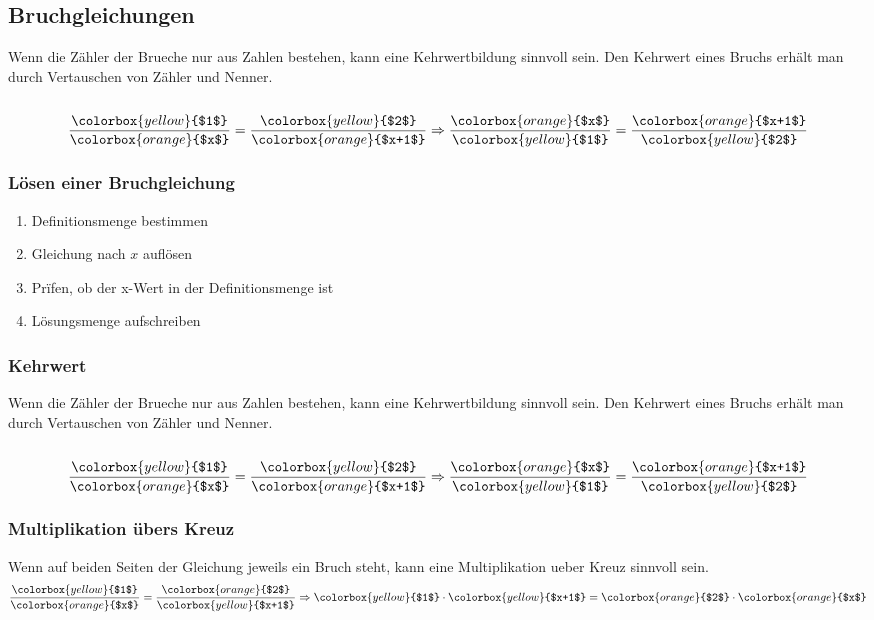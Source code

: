 \begin{multicols*}{3}
    \subsection*{Bruchgleichungen}
    Wenn die Zähler der Brueche nur aus Zahlen bestehen, kann eine Kehrwertbildung sinnvoll sein.
    Den Kehrwert eines Bruchs erhält man durch Vertauschen von Zähler und Nenner.\\~\\
    \[\frac{{\colorbox{yellow}{$1$}}}{{\colorbox{orange}{$x$}}} = \frac{{\colorbox{yellow}{$2$}}}{{\colorbox{orange}{$x+1$}}} \Rightarrow  \frac{{\colorbox{orange}{$x$}}}{{\colorbox{yellow}{$1$}}} = \frac{{\colorbox{orange}{$x+1$}}}{{\colorbox{yellow}{$2$}}}\]
    \subsubsection*{Lösen einer Bruchgleichung}
    \begin{enumerate}
        \item Definitionsmenge bestimmen
        \item Gleichung nach $x$ auflösen
        \item Prïfen, ob der x-Wert in der Definitionsmenge ist
        \item Lösungsmenge aufschreiben
    \end{enumerate}
    \subsubsection*{Kehrwert}
    Wenn die Zähler der Brueche nur aus Zahlen bestehen, kann eine Kehrwertbildung sinnvoll sein.
    Den Kehrwert eines Bruchs erhält man durch Vertauschen von Zähler und Nenner.\\~\\
    \[\frac{{\colorbox{yellow}{$1$}}}{{\colorbox{orange}{$x$}}} = \frac{{\colorbox{yellow}{$2$}}}{{\colorbox{orange}{$x+1$}}} \Rightarrow  \frac{{\colorbox{orange}{$x$}}}{{\colorbox{yellow}{$1$}}} = \frac{{\colorbox{orange}{$x+1$}}}{{\colorbox{yellow}{$2$}}}\]


    \subsubsection*{Multiplikation übers Kreuz}
    Wenn auf beiden Seiten der Gleichung jeweils ein Bruch steht, kann eine Multiplikation ueber Kreuz sinnvoll sein.
    \[\frac{{\colorbox{yellow}{$1$}}}{{\colorbox{orange}{$x$}}} = \frac{{\colorbox{orange}{$2$}}}{{\colorbox{yellow}{$x+1$}}} \Rightarrow {\colorbox{yellow}{$1$}} \cdot {\colorbox{yellow}{$x+1$}} = {\colorbox{orange}{$2$}} \cdot {\colorbox{orange}{$x$}}\]


\end{multicols*}
